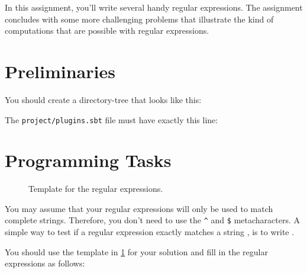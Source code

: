 
In this assignment, you'll write several handy regular expressions. The assignment concludes with some more challenging problems that illustrate the kind of computations that are possible with regular expressions.

\section{Preliminaries}

You should create a directory-tree that looks like this:


The \texttt{project/plugins.sbt} file must have exactly this line:


\section{Programming Tasks}

\begin{figure}
\caption{Template for the regular expressions.}
\label{regex_template}
\end{figure}

You may assume that your regular expressions will only be used to match complete strings. Therefore, you don't need to use the \texttt{\^} and \texttt{\$} metacharacters. A simple way to test if a regular expression  exactly matches a string , is to write .

You should use the template in \cref{regex_template} for your solution and fill in the regular expressions as follows:

